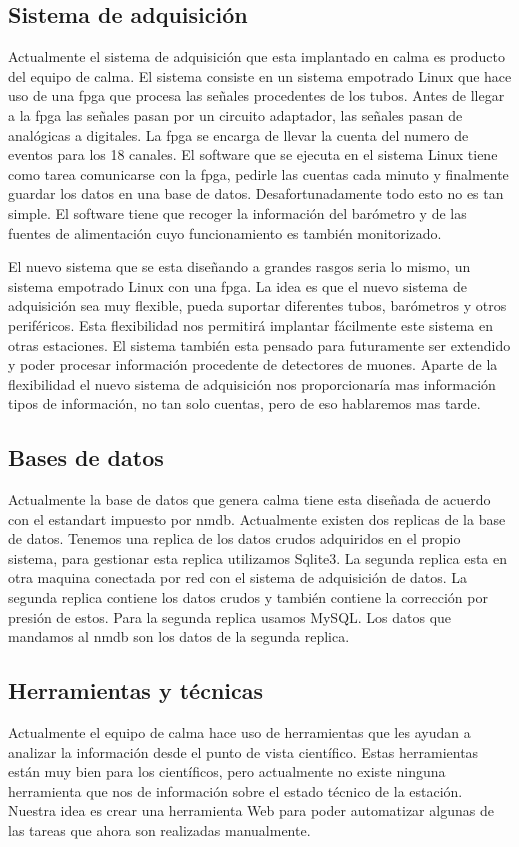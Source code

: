 	\subsection{Sistema de adquisición}
		Actualmente el sistema de adquisición que esta implantado en \gls{calma} es producto del equipo de \gls{calma}. El sistema consiste en un sistema empotrado
		Linux que hace uso de una \gls{fpga} que procesa las señales procedentes de los tubos. Antes de llegar a la \gls{fpga} las señales pasan por un circuito 
		adaptador, las señales pasan de analógicas a digitales. La \gls{fpga} se encarga de llevar la cuenta del numero de eventos para los 18 canales. El 
		software que se ejecuta en el sistema Linux tiene como tarea comunicarse con la \gls{fpga}, pedirle las cuentas cada minuto y finalmente guardar los
		datos en una base de datos. Desafortunadamente todo esto no es tan simple. El software tiene que recoger la información del barómetro y de las
		fuentes de alimentación cuyo funcionamiento es también monitorizado. 
		\par 
		El nuevo sistema que se esta diseñando a grandes rasgos seria lo mismo, un sistema empotrado Linux con una \gls{fpga}. La idea es que el nuevo sistema
		de adquisición sea muy flexible, pueda suportar diferentes tubos, barómetros y otros periféricos. Esta flexibilidad nos permitirá implantar 
		fácilmente este sistema en otras estaciones. El sistema también esta pensado para futuramente ser extendido y poder procesar información 
		procedente de detectores de muones. Aparte de la flexibilidad el nuevo sistema de adquisición nos proporcionaría mas información tipos de 
		información, no tan solo cuentas, pero de eso hablaremos mas tarde. 
	\subsection{Bases de datos}
		Actualmente la base de datos que genera \gls{calma} tiene esta diseñada de acuerdo con el estandart impuesto por \gls{nmdb}. Actualmente existen dos replicas
		de la base de datos. Tenemos una replica de los datos crudos adquiridos en el propio sistema, para gestionar esta replica utilizamos Sqlite3. La
		segunda replica esta en otra maquina conectada por red con el sistema de adquisición de datos. La segunda replica contiene los datos crudos y 
		también contiene la corrección por presión de estos. Para la segunda replica usamos MySQL. Los datos que mandamos al \gls{nmdb} son los datos de la 
		segunda replica.
	\subsection{Herramientas y técnicas}
		Actualmente el equipo de \gls{calma} hace uso de herramientas que les ayudan a analizar la información desde el punto de vista científico. Estas 
		herramientas están muy bien para los científicos, pero actualmente no existe ninguna herramienta que nos de información sobre el estado técnico 
		de la estación. Nuestra idea es crear una herramienta Web para poder automatizar algunas de las tareas que ahora son realizadas manualmente. 


